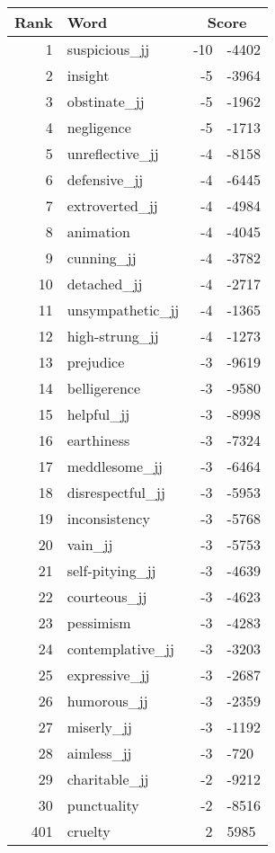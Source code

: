 \begin{longtable}[!htbp]{| rlr@{.}l |}
    \hline
    \textbf{Rank} & \textbf{Word} & \multicolumn{2}{c|}{\textbf{Score}} \\
    \hline
    \endhead
    1 & suspicious\_jj & -10 & -4402 \\
    2 & insight & -5 & -3964 \\
    3 & obstinate\_jj & -5 & -1962 \\
    4 & negligence & -5 & -1713 \\
    5 & unreflective\_jj & -4 & -8158 \\
    6 & defensive\_jj & -4 & -6445 \\
    7 & extroverted\_jj & -4 & -4984 \\
    8 & animation & -4 & -4045 \\
    9 & cunning\_jj & -4 & -3782 \\
    10 & detached\_jj & -4 & -2717 \\
    11 & unsympathetic\_jj & -4 & -1365 \\
    12 & high-strung\_jj & -4 & -1273 \\
    13 & prejudice & -3 & -9619 \\
    14 & belligerence & -3 & -9580 \\
    15 & helpful\_jj & -3 & -8998 \\
    16 & earthiness & -3 & -7324 \\
    17 & meddlesome\_jj & -3 & -6464 \\
    18 & disrespectful\_jj & -3 & -5953 \\
    19 & inconsistency & -3 & -5768 \\
    20 & vain\_jj & -3 & -5753 \\
    21 & self-pitying\_jj & -3 & -4639 \\
    22 & courteous\_jj & -3 & -4623 \\
    23 & pessimism & -3 & -4283 \\
    24 & contemplative\_jj & -3 & -3203 \\
    25 & expressive\_jj & -3 & -2687 \\
    26 & humorous\_jj & -3 & -2359 \\
    27 & miserly\_jj & -3 & -1192 \\
    28 & aimless\_jj & -3 & -720 \\
    29 & charitable\_jj & -2 & -9212 \\
    30 & punctuality & -2 & -8516 \\
    401 & cruelty & 2 & 5985 \\

\end{longtable}
